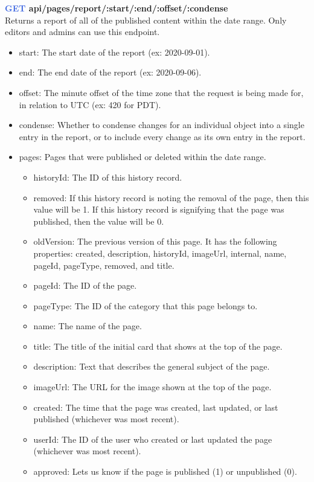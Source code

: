 \documentclass[onecolumn, draftclsnofoot,10pt, compsoc, usenames, dvipsnames]{IEEEtran}
\begin{document}
\noindent
\textbf{\textcolor{RoyalBlue}{GET} api/pages/report/:start/:end/:offset/:condense} \\
Returns a report of all of the published content within the date range. Only editors and admins can use this endpoint.
\begin{itemize}
  \item start: The start date of the report (ex: 2020-09-01).
  \item end: The end date of the report (ex: 2020-09-06).
  \item offset: The minute offset of the time zone that the request is being made for, in relation to UTC (ex: 420 for PDT).
  \item condense: Whether to condense changes for an individual object into a single entry in the report, or to include every change as its own entry in the report.
  \item pages: Pages that were published or deleted within the date range.
  \begin{itemize}
    \item historyId: The ID of this history record.
    \item removed: If this history record is noting the removal of the page, then this value will be 1. If this history record is signifying that the page was published, then the value will be 0.
    \item oldVersion: The previous version of this page. It has the following properties: created, description, historyId, imageUrl, internal, name, pageId, pageType, removed, and title.
    \item pageId: The ID of the page.
    \item pageType: The ID of the category that this page belongs to.
    \item name: The name of the page.
    \item title: The title of the initial card that shows at the top of the page.
    \item description: Text that describes the general subject of the page.
    \item imageUrl: The URL for the image shown at the top of the page.
    \item created: The time that the page was created, last updated, or last published (whichever was most recent).
    \item userId: The ID of the user who created or last updated the page (whichever was most recent).
    \item approved: Lets us know if the page is published (1) or unpublished (0).

\end{itemize}
\end{itemize}
\end{document}
